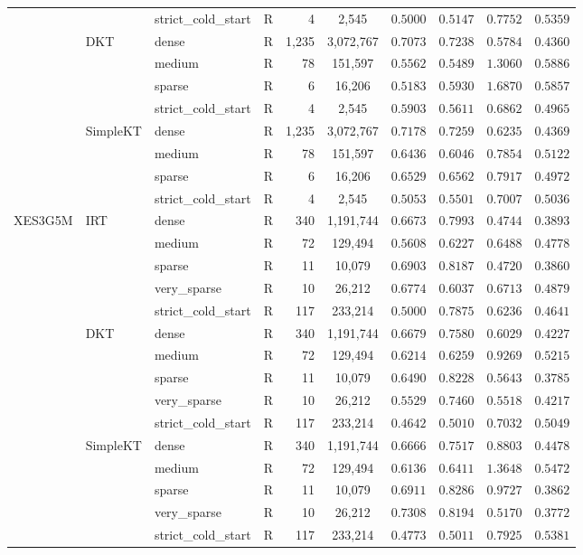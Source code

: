 \begin{table}[tbp]
{\begin{tabular}{lllcrccccc}
 &  & strict\_cold\_start & R & 4 & 2,545 & $0.5000$ & $0.5147$ & $0.7752$ & $0.5359$ \\
 & DKT & dense & R & 1,235 & 3,072,767 & $0.7073$ & $0.7238$ & $0.5784$ & $0.4360$ \\
 &  & medium & R & 78 & 151,597 & $0.5562$ & $0.5489$ & $1.3060$ & $0.5886$ \\
 &  & sparse & R & 6 & 16,206 & $0.5183$ & $0.5930$ & $1.6870$ & $0.5857$ \\
 &  & strict\_cold\_start & R & 4 & 2,545 & $0.5903$ & $0.5611$ & $0.6862$ & $0.4965$ \\
 & SimpleKT & dense & R & 1,235 & 3,072,767 & $0.7178$ & $0.7259$ & $0.6235$ & $0.4369$ \\
 &  & medium & R & 78 & 151,597 & $0.6436$ & $0.6046$ & $0.7854$ & $0.5122$ \\
 &  & sparse & R & 6 & 16,206 & $0.6529$ & $0.6562$ & $0.7917$ & $0.4972$ \\
 &  & strict\_cold\_start & R & 4 & 2,545 & $0.5053$ & $0.5501$ & $0.7007$ & $0.5036$ \\
\midrule
XES3G5M & IRT & dense & R & 340 & 1,191,744 & $0.6673$ & $0.7993$ & $0.4744$ & $0.3893$ \\
 &  & medium & R & 72 & 129,494 & $0.5608$ & $0.6227$ & $0.6488$ & $0.4778$ \\
 &  & sparse & R & 11 & 10,079 & $0.6903$ & $0.8187$ & $0.4720$ & $0.3860$ \\
 &  & very\_sparse & R & 10 & 26,212 & $0.6774$ & $0.6037$ & $0.6713$ & $0.4879$ \\
 &  & strict\_cold\_start & R & 117 & 233,214 & $0.5000$ & $0.7875$ & $0.6236$ & $0.4641$ \\
 & DKT & dense & R & 340 & 1,191,744 & $0.6679$ & $0.7580$ & $0.6029$ & $0.4227$ \\
 &  & medium & R & 72 & 129,494 & $0.6214$ & $0.6259$ & $0.9269$ & $0.5215$ \\
 &  & sparse & R & 11 & 10,079 & $0.6490$ & $0.8228$ & $0.5643$ & $0.3785$ \\
 &  & very\_sparse & R & 10 & 26,212 & $0.5529$ & $0.7460$ & $0.5518$ & $0.4217$ \\
 &  & strict\_cold\_start & R & 117 & 233,214 & $0.4642$ & $0.5010$ & $0.7032$ & $0.5049$ \\
 & SimpleKT & dense & R & 340 & 1,191,744 & $0.6666$ & $0.7517$ & $0.8803$ & $0.4478$ \\
 &  & medium & R & 72 & 129,494 & $0.6136$ & $0.6411$ & $1.3648$ & $0.5472$ \\
 &  & sparse & R & 11 & 10,079 & $0.6911$ & $0.8286$ & $0.9727$ & $0.3862$ \\
 &  & very\_sparse & R & 10 & 26,212 & $0.7308$ & $0.8194$ & $0.5170$ & $0.3772$ \\
 &  & strict\_cold\_start & R & 117 & 233,214 & $0.4773$ & $0.5011$ & $0.7925$ & $0.5381$ \\
\bottomrule
\end{tabular}%
}
\end{table}
